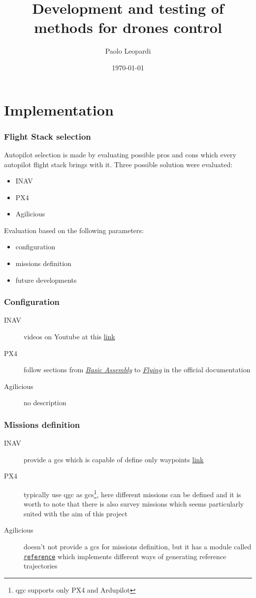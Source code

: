 \documentclass{beamer}
\title{Development and testing of methods for drones control}
\author{Paolo Leopardi}
\institute{Università degli Studi di Perugia}
\date{\today}
\begin{document}
	
	\frame{\titlepage}
	
	\section{Implementation}
	
	\begin{frame}
		\frametitle{Flight Stack selection}
		Autopilot selection is made by evaluating possible pros and cons which every autopilot flight stack brings with it. Three possible solution were evaluated:
		\begin{itemize}
			\item INAV \cite{inav}
			\item PX4 \cite{px4}
			\item Agilicious \cite{foehn2022agilicious}
		\end{itemize}

	Evaluation based on the following parameters:
	\begin{itemize}
		\item configuration
		\item missions definition
		\item future developments
	\end{itemize}
	\end{frame}

	\begin{frame} \frametitle{Configuration}
		\begin{description}
			\item[INAV] videos on Youtube at this \href{https://www.youtube.com/playlist?list=PLOUQ8o2_nCLkfcKsWobDLtBNIBzwlwRC8}{link}
			\item[PX4] follow sections from \href{https://docs.px4.io/main/en/assembly/}{\textit{Basic Assembly}} to \href{https://docs.px4.io/main/en/flying/}{\textit{Flying}} in the official documentation
			\item[Agilicious] no description
		\end{description}		
	\end{frame}

	\begin{frame} \frametitle{Missions definition}
		\begin{description}
			\item[INAV] provide a \ac{gcs} which is capable of define only waypoints \href{https://www.youtube.com/playlist?list=PLOUQ8o2_nCLkfcKsWobDLtBNIBzwlwRC8}{link}
			\item[PX4] typically use \ac{qgc} as \ac{gcs}\footnote{\ac{qgc} supports only PX4 and Ardupilot}, here different missions can be defined and it is worth to note that there is also survey missions which seems particularly suited with the aim of this project
			\item[Agilicious] doesn't not provide a \ac{gcs} for missions definition, but it has a module called \href{https://agilicious.readthedocs.io/en/main/modules/references.html}{\texttt{reference}} which implements different ways of generating reference trajectories
		\end{description}	
	\end{frame}
\end{document}
